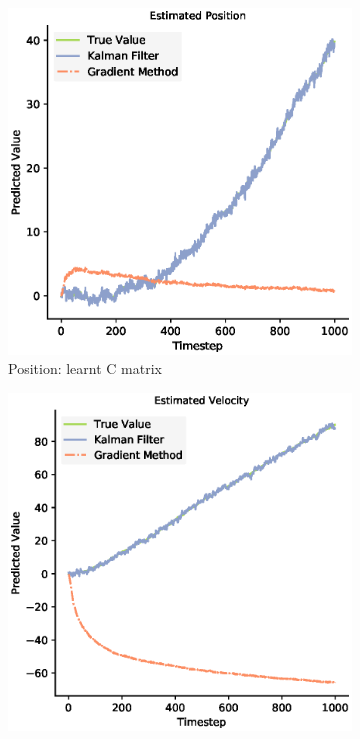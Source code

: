 \begin{figure}
 \begin{subfigure}{0.49\textwidth}
 \centering
 \includegraphics[width=.95\linewidth]{chapter_3_figures/Estimated_Position_C_matrix.eps}
 \caption{Position: learnt C matrix}
 \end{subfigure}%
 \begin{subfigure}{0.49\textwidth}
 \centering
 \includegraphics[width=.95\linewidth]{chapter_3_figures/Estimated_Velocity_C_matrix.eps}

\end{subfigure}
\end{figure}
